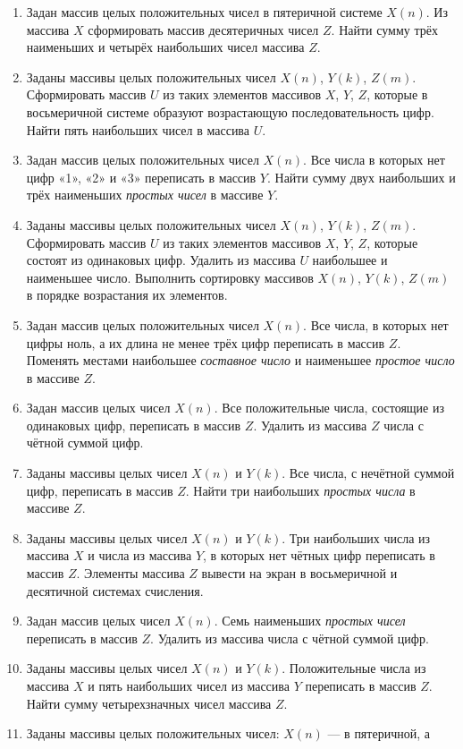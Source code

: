 \begin{enumerate}
\item Задан массив целых положительных чисел в пятеричной системе $X(n)$. Из массива
$X$ сформировать массив десятеричных чисел $Z$. Найти сумму трёх наименьших и четырёх наибольших
чисел массива $Z$. 
\item Заданы массивы целых положительных чисел $X(n)$, $Y(k)$,
$Z(m)$. Сформировать массив $U$ из таких элементов массивов
$X$, $Y$, $Z$, которые в восьмеричной системе образуют возрастающую
последовательность цифр. Найти пять наибольших чисел в массива $U$.
\item Задан массив целых положительных чисел $X(n)$. Все числа в которых нет цифр «1», «2» и
«3» переписать в массив $Y$. Найти сумму двух наибольших и трёх наименьших \emph{простых
чисел} в массиве $Y$. 
\item Заданы массивы целых положительных чисел $X(n)$, $Y(k)$,
$Z(m)$. Сформировать массив $U$ из таких элементов массивов
$X$, $Y$, $Z$, которые состоят из одинаковых цифр. Удалить из массива
$U$ наибольшее и наименьшее число. Выполнить сортировку массивов $X(n)$,
$Y(k)$, $Z(m)$ в порядке возрастания их элементов.
\item Задан массив целых положительных чисел $X(n)$. Все числа, в которых нет цифры ноль, а их
длина не менее трёх цифр переписать в массив $Z$. Поменять местами наибольшее \emph{составное
число} и наименьшее \emph{простое число} в массиве $Z$.
\item Задан массив целых чисел $X(n)$. Все положительные числа, состоящие из одинаковых цифр,
переписать в массив $Z$. Удалить из массива $Z$ числа с чётной суммой цифр.
\item Заданы массивы целых чисел $X(n)$ и $Y(k)$. Все числа, с
нечётной суммой цифр, переписать в массив $Z$. Найти три наибольших \emph{простых числа} в массиве $Z$.
\item Заданы массивы целых чисел $X(n)$ и $Y(k)$. Три наибольших числа
из массива $X$ и числа из массива $Y$, в которых нет чётных цифр переписать в массив
$Z$. Элементы массива $Z$ вывести на экран в восьмеричной и десятичной системах
счисления.
\item Задан массив целых чисел $X(n)$. Семь наименьших \emph{простых чисел}
переписать в массив $Z$. Удалить из массива числа с чётной суммой цифр.
\item Заданы массивы целых чисел $X(n)$ и $Y(k)$. Положительные числа
из массива $X$ и пять наибольших чисел из массива $Y$ переписать в массив
$Z$. Найти сумму четырехзначных чисел массива $Z$.
\item Заданы массивы целых положительных чисел:  $X(n)$ --- в пятеричной, а

\end{enumerate}

